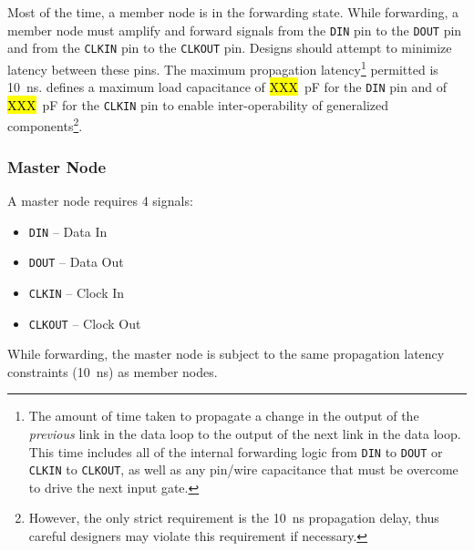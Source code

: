 Most of the time, a member node is in the {\sc forwarding} state. While
forwarding, a member node must amplify and forward signals from the {\tt DIN}
pin to the {\tt DOUT} pin and from the {\tt CLKIN} pin to the {\tt CLKOUT} pin.
Designs should attempt to minimize latency between these pins. The maximum
propagation latency\footnote{
  The amount of time taken to propagate a change in the output of the {\em
  previous} link in the data loop to the output of the next link in the data
  loop. This time includes all of the internal forwarding logic from {\tt DIN}
  to {\tt DOUT} or {\tt CLKIN} to {\tt CLKOUT}, as well as any pin/wire
  capacitance that must be overcome to drive the next input gate.
  }
permitted is 10~ns. \bus defines a maximum load capacitance of \hl{XXX}~pF for
the {\tt DIN} pin and of \hl{XXX}~pF for the {\tt CLKIN} pin to enable
inter-operability of generalized components\footnote{
  However, the only strict requirement is the 10~ns propagation delay, thus
  careful designers may violate this requirement if necessary.
  }.

\subsubsection{Master Node}
\label{sec:physical-master}
A master node requires 4 signals:

\begin{itemize}
  \item {\tt DIN} -- Data In
  \item {\tt DOUT} -- Data Out
  \item {\tt CLKIN} -- Clock In
  \item {\tt CLKOUT} -- Clock Out
\end{itemize}

While forwarding, the master node is subject to the same propagation latency
constraints (10~ns) as member nodes.


